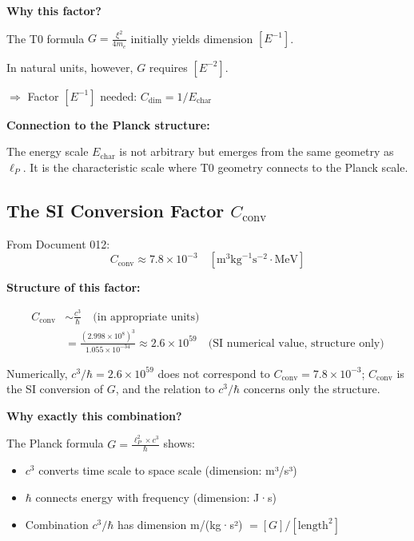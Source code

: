 	\textbf{Why this factor?}
	
	The T0 formula $G = \frac{\xi^2}{4m_e}$ initially yields dimension $[E^{-1}]$.
	
	In natural units, however, $G$ requires $[E^{-2}]$.
	
	$\Rightarrow$ Factor $[E^{-1}]$ needed: $C_{\text{dim}} = 1/E_{\text{char}}$
	
	\textbf{Connection to the Planck structure:}
	
	The energy scale $E_{\text{char}}$ is not arbitrary but emerges from the same geometry as $\ell_P$. It is the characteristic scale where T0 geometry connects to the Planck scale.
	
	\subsection{The SI Conversion Factor $C_{\text{conv}}$}
	
	From Document 012:
	\begin{equation}
		C_{\text{conv}} \approx 7.8 \times 10^{-3} \quad [\text{m}^3 \text{kg}^{-1} \text{s}^{-2} \cdot \text{MeV}]
	\end{equation}
	
	\textbf{Structure of this factor:}
	
	\begin{align}
		C_{\text{conv}} &\sim \frac{c^3}{\hbar} \quad \text{(in appropriate units)} \\
		&= \frac{(2.998 \times 10^8)^3}{1.055 \times 10^{-34}} \approx 2.6 \times 10^{59} \quad \text{(SI numerical value, structure only)}
	\end{align}
	

	Numerically, $c^3/\hbar = 2.6\times10^{59}$ does not correspond to $C_{\text{conv}} = 7.8\times10^{-3}$; $C_{\text{conv}}$ is the SI conversion of $G$, and the relation to $c^3/\hbar$ concerns only the structure.
	
	\textbf{Why exactly this combination?}
	
	The Planck formula $G = \frac{\ell_P^2 \times c^3}{\hbar}$ shows:
	\begin{itemize}
		\item $c^3$ converts time scale to space scale (dimension: m³/s³)
		\item $\hbar$ connects energy with frequency (dimension: J·s)
		\item Combination $c^3/\hbar$ has dimension m/(kg·s²) $= [G]/[\text{length}^2]$
	\end{itemize}
	

